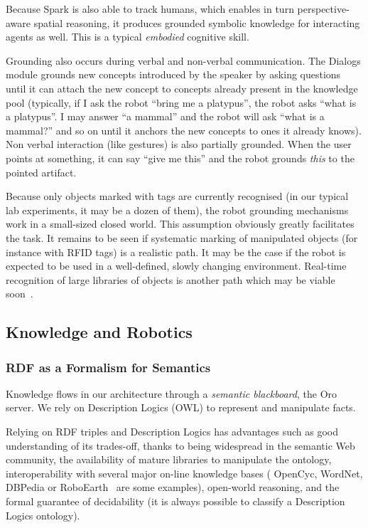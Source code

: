 \documentclass[preprint,3p,times]{elsarticle}
\begin{document}
Because {\sc Spark} is also able to track humans, which enables in turn
perspective-aware spatial reasoning, it produces grounded symbolic knowledge
for interacting agents as well. This is a typical \emph{embodied} cognitive
skill.

Grounding also occurs during verbal and non-verbal communication. The {\sc
Dialogs} module grounds new concepts introduced by the speaker by asking questions
until it can attach the new concept to concepts already present in the
knowledge pool (typically, if I ask the robot ``bring me a platypus'', the
robot asks ``what is a platypus''. I may answer ``a mammal'' and the robot will
ask ``what is a mammal?'' and so on until it anchors the new concepts to ones
it already knows). Non verbal interaction (like gestures) is also partially
grounded. When the user points at something, it can say ``give me this'' and
the robot grounds \emph{this} to the pointed artifact.

Because only objects marked with tags are currently recognised (in our typical
lab experiments, it may be a dozen of them), the robot grounding mechanisms work
in a small-sized closed world. This assumption obviously greatly facilitates
the task. It remains to be seen if systematic marking of manipulated objects
(for instance with RFID tags) is a realistic path. It may be the case if the
robot is expected to be used in a well-defined, slowly changing environment.
Real-time recognition of large libraries of objects is another path which may
be viable soon~\cite{Dean2013Fast}.


\subsection{Knowledge and Robotics}
\label{krs-discussion}

\subsubsection{RDF as a Formalism for Semantics}

Knowledge flows in our architecture through a \emph{semantic blackboard}, the
{\sc Oro} server. We rely on Description Logics (OWL) to represent and
manipulate facts.

Relying on RDF triples and Description Logics has advantages such as good
understanding of its trades-off, thanks to being widespread in the semantic Web
community, the availability of mature libraries to manipulate the ontology,
interoperability with several major on-line knowledge bases ({\sc
OpenCyc}, {\sc WordNet}, {\sc DBPedia} or {\sc RoboEarth}~\cite{Waibel2011} are
some examples), open-world reasoning, and the formal guarantee of decidability
(it is always possible to classify a Description Logics ontology).
\end{document}
